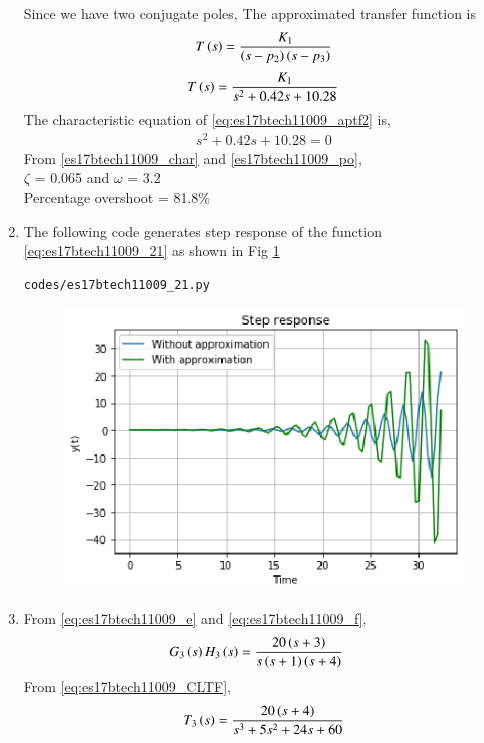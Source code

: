 \begin{enumerate}[label=\thesection.\arabic*.,ref=\thesection.\theenumi]
\begin{table}[!ht]
\centering

\caption{}
\label{table:es17btech11009_t2}
\end{table}
Since we have two conjugate poles, The approximated transfer function is
\begin{align}
T\left(s\right) = \frac{K_1}{\left(s-p_{2}\right)\left(s-p_{3}\right)}
\end{align}
\begin{align}
    T\brak{s}= \frac{K_1}{s^2 + 0.42s + 10.28}
    \label{eq:es17btech11009_aptf2}
\end{align}
The characteristic equation of \eqref{eq:es17btech11009_aptf2} is,
\begin{align}
s^2 + 0.42s + 10.28 = 0
 \end{align}
From \eqref{es17btech11009_char} and \eqref{es17btech11009_po},
\\
 $\zeta$ = 0.065 and $\omega$ = 3.2
 \\
 Percentage overshoot = 81.8\%
 \item
The following code generates step response of the function \eqref{eq:es17btech11009_21} as shown in Fig \ref{fig:es17btech11009_fig21}
\begin{lstlisting}
codes/es17btech11009_21.py
\end{lstlisting}
\begin{figure}[!h]
\centering
\includegraphics[width=\columnwidth]{./figs/es17btech11009_21.eps}
\caption{}
\label{fig:es17btech11009_fig21}
\end{figure}

\item
From \eqref{eq:es17btech11009_e} and \eqref{eq:es17btech11009_f},
\begin{align}
G_{3}\brak{s}H_{3}\brak{s}&= \frac{20\brak{s+3}}{s\brak{s+1}\brak{s+4}}
\label{eq:es17btech11009_cc}
\end{align}
\solution
From \eqref{eq:es17btech11009_CLTF},
 \begin{align}
T_{3}\brak{s} = \frac{20\brak{s+4}}{s^3 + 5s^2 + 24s + 60}
\label{eq:es17btech11009_31}
 \end{align}


\end{enumerate}
